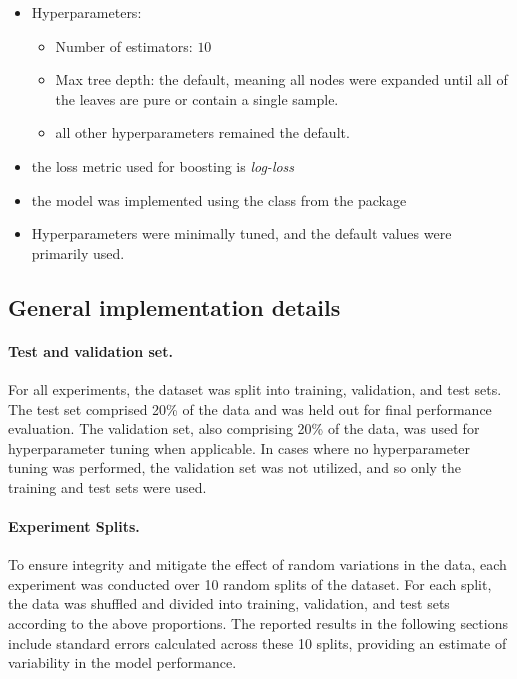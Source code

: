 \begin{enumerate}
\begin{itemize}
        \item Hyperparameters:
    \begin{itemize}
        \item Number of estimators: $10$
        \item Max tree depth: the default, meaning all nodes were expanded until all of the leaves are pure or contain a single sample.
        \item all other hyperparameters remained the default.
    \end{itemize}
        \item the loss metric used for boosting is \emph{log-loss}
        \item the model was implemented using the  class from the  package
        \item Hyperparameters were minimally tuned, and the default values were primarily used.
    \end{itemize}
    
\end{enumerate}

\subsection{General implementation details}

\label{appx:exp_details:general}
\paragraph{Test and validation set.}
For all experiments, the dataset was split into training, validation, and test sets. The test set comprised 20\% of the data and was held out for final performance evaluation. The validation set, also comprising 20\% of the data, was used for hyperparameter tuning when applicable. In cases where no hyperparameter tuning was performed, the validation set was not utilized, and so only the training and test sets were used.
\paragraph{Experiment Splits.}
To ensure integrity and mitigate the effect of random variations in the data, each experiment was conducted over 10 random splits of the dataset. For each split, the data was shuffled and divided into training, validation, and test sets according to the above proportions. The reported results in the following sections include standard errors calculated across these 10 splits, providing an estimate of variability in the model performance.
    
